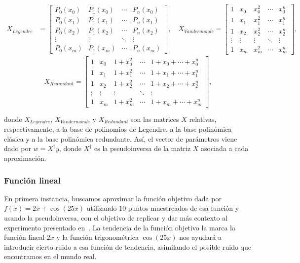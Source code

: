 \[
\begin{aligned}
    X_{Legendre} &= 
    \begin{bmatrix}
        P_0(x_0) & P_1(x_0) & \cdots & P_n(x_0) \\
        P_0(x_1) & P_1(x_1) & \cdots & P_n(x_1) \\
        P_0(x_2) & P_1(x_2) & \cdots & P_n(x_2) \\
        \vdots & \vdots & \ddots & \vdots \\
        P_0(x_m) & P_1(x_m) & \cdots & P_n(x_m)
    \end{bmatrix},
    \quad
    X_{Vandermonde} = 
    \begin{bmatrix}
        1 & x_0 & x_0^2 & \cdots & x_0^n \\
        1 & x_1 & x_1^2 & \cdots & x_1^n \\
        1 & x_2 & x_2^2 & \cdots & x_2^n \\
        \vdots & \vdots & \vdots & \ddots & \vdots \\
        1 & x_m & x_m^2 & \cdots & x_m^n
    \end{bmatrix},
\end{aligned}
\]
\vspace{0.5cm}
\[
X_{Redundant} = 
\begin{bmatrix}
    1 & x_0 & 1+x_0^2 & \cdots & 1+x_0+\cdots+x_0^n \\
    1 & x_1 & 1+x_1^2 & \cdots & 1+x_1+\cdots+x_1^n \\
    1 & x_2 & 1+x_2^2 & \cdots & 1+x_2+\cdots+x_2^n \\
    \vdots & \vdots  & \vdots & \ddots & \vdots \\
    1 & x_m & 1+x_m^2 & \cdots & 1+x_m+\cdots+x_m^n
\end{bmatrix},
\]

donde $X_{Legendre}$, $X_{Vandermonde}$ y $X_{Redundant}$ son las matrices $X$ relativas, respectivamente, a la base de polinomios de Legendre, a la base polinómica clásica y a la base polinómica redundante. Así, el vector de parámetros viene dado por $w = X^{\dagger} y$, donde $X^{\dagger}$ es la pseudoinversa de la matriz $X$ asociada a cada aproximación.

\subsubsection{Función lineal}\label{subsubsec:funcion-lineal}

En primera instancia, buscamos aproximar la función objetivo dada por $f(x) = 2x + \cos(25x)$ utilizando $10$ puntos muestreados de esa función y usando la pseudoinversa, con el objetivo de replicar y dar más contexto al experimento presentado en~\cite{Schaeffer2023}. La tendencia de la función objetivo la marca la función lineal $2x$ y la función trigonométrica $\cos(25x)$ nos ayudará a introducir cierto ruido a esa función de tendencia, asimilando el posible ruido que encontramos en el mundo real.

